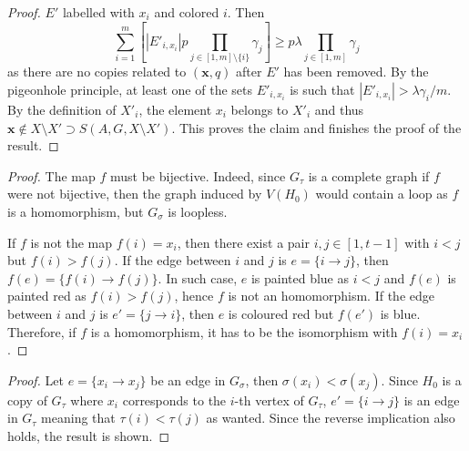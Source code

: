 \begin {proof}
$E'$ labelled with $x_i$ and colored $i$. Then \begin {displaymath} \sum _{i=1}^m \left [|E'_{i,x_i}| p\prod _{j\in [1,m]\setminus \{i\}} \gamma _j \right ]\geq p \lambda \prod _{j\in [1,m]} \gamma _j \end {displaymath} as there are no copies related to $(\mathbf {x},q)$ after $E'$ has been removed. By the pigeonhole principle, at least one of the sets $E'_{i,x_i}$ is such that $|E'_{i,x_i}|>\lambda \gamma _i/m$. By the definition of $X'_i$, the element $x_i$ belongs to $X'_i$ and thus $\mathbf {x}\not \in X\setminus X' \supset S(A,G,X\setminus X')$. This proves the claim and finishes the proof of the result.
 \end {proof} 
 
 \begin {proof} 
 The map $f$ must be bijective. Indeed, since $G_{\tau }$ is a complete graph if $f$ were not bijective, then the graph induced by $V(H_0)$ would contain a loop as $f$ is a homomorphism, but $G_{\sigma }$ is loopless. \par If $f$ is not the map $f(i)=x_i$, then there exist a pair $i,j\in [1,t-1]$ with $i<j$ but $f(i)>f(j)$. If the edge between $i$ and $j$ is $e=\{i\to j\}$, then $f(e)=\{f(i)\to f(j)\}$. In such case, $e$ is painted blue as $i<j$ and $f(e)$ is painted red as $f(i)>f(j)$, hence $f$ is not an homomorphism. If the edge between $i$ and $j$ is $e'=\{j\to i\}$, then $e$ is coloured red but $f(e')$ is blue. Therefore, if $f$ is a homomorphism, it has to be the isomorphism with $f(i)=x_i$.
 \end {proof} 
 
 \begin {proof} 
 Let $e=\{x_i\to x_j\}$ be an edge in $G_{\sigma }$, then $\sigma (x_i)<\sigma (x_j)$. Since $H_0$ is a copy of $G_{\tau }$ where $x_i$ corresponds to the $i$-th vertex of $G_{\tau }$, $e'=\{i\to j\}$ is an edge in $G_{\tau }$ meaning that $\tau (i)<\tau (j)$ as wanted. Since the reverse implication also holds, the result is shown.
 \end {proof} 
 
